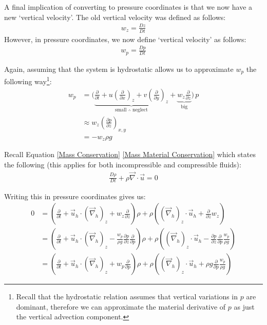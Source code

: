 A final implication of converting to pressure coordinates is that we now have a new `vertical velocity'. The old vertical velocity was defined as follows:
\begin{align*}
    w_z = \frac{D z}{Dt}
\end{align*}
However, in pressure coordinates, we now define `vertical velocity' as follows:
\begin{align*}
    w_p = \frac{D p}{Dt}
\end{align*}

Again, assuming that the system is hydrostatic allows us to approximate $w_p$ the following way\footnote{
    Recall that the hydrostatic relation assumes that vertical variations in $p$ are dominant, therefore we can approximate the material derivative of $p$ as just the vertical advection component.
}:
\begin{align*}
    w_p &= \biggl( \underbrace{\frac{\partial }{\partial t} + u\left( \frac{\partial}{\partial x} \right)_{z}+v\left( \frac{\partial}{\partial y} \right)_{z}}_{\text{small }\therefore \text{ neglect}}+\underbrace{w_z \frac{\partial}{\partial z}}_{\text{big}} \biggr)\, p
    \\
    &\approx w_z \left( \frac{\partial p}{\partial z} \right)_{x,y}
    \\
    & = -w_z\rho g
\end{align*}

Recall Equation \ref{Mass Conservation} \ref{Mass Material Conservation} which states the following (this applies for both incompressible and compressible fluids):
\begin{align*}
    \frac{D\rho}{Dt}+\rho\vec{\nabla}\cdot\vec{u}=0
\end{align*}

Writing this in pressure coordinates gives us:
\begin{align*}
    0&=\left( 
        \frac{\partial}{\partial t} 
        + \vec{u}_h \cdot \left( \vec{\nabla}_h \right)_z
        + w_z \frac{\partial}{\partial z}
    \right)\rho
    + \rho \left( 
        \left( \vec{\nabla}_h  \right)_z \cdot \vec{u}_h
        + \frac{\partial}{\partial z}w_z
    \right)
    \\
    &=\left( 
        \frac{\partial}{\partial t} 
        + \vec{u}_h \cdot \left( \vec{\nabla}_h \right)_z
        - \frac{w_p}{\rho g} \frac{\partial p}{\partial z}\frac{\partial}{\partial p}
    \right)\rho
    + \rho \left( 
        \left( \vec{\nabla}_h  \right)_z \cdot \vec{u}_h
        - \frac{\partial p}{\partial z} \frac{\partial}{\partial p} \frac{w_p}{\rho g}
    \right)
    \\
    &=\left( 
        \frac{\partial}{\partial t} 
        + \vec{u}_h \cdot \left( \vec{\nabla}_h \right)_z
        + w_p \frac{\partial}{\partial p}
    \right)\rho
    + \rho \left( 
        \left( \vec{\nabla}_h  \right)_z \cdot \vec{u}_h
        +\rho g \frac{\partial}{\partial p} \frac{w_p}{\rho g}
    \right)
\end{align*}



